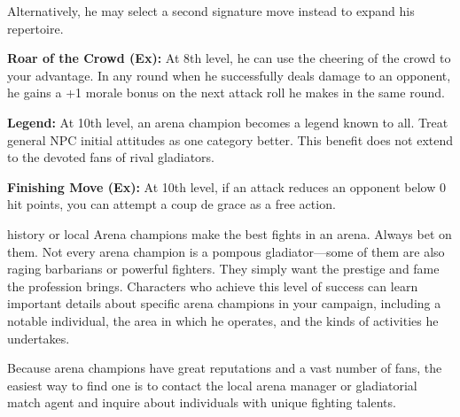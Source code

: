 {Alternatively, he may select a second signature move instead to expand his repertoire.

\textbf{Roar of the Crowd (Ex):} At 8th level, he can use the cheering of the crowd to your advantage. In any round when he successfully deals damage to an opponent, he gains a +1 morale bonus on the next attack roll he makes in the same round.

\textbf{Legend:} At 10th level, an arena champion becomes a legend known to all. Treat general NPC initial attitudes as one category better. This benefit does not extend to the devoted fans of rival gladiators.

\textbf{Finishing Move (Ex):} At 10th level, if an attack reduces an opponent below 0 hit points, you can attempt a coup de grace as a free action.
}
{}
{history or local}
{Arena champions make the best fights in an arena. Always bet on them.}
{Not every arena champion is a pompous gladiator---some of them are also raging barbarians or powerful fighters. They simply want the prestige and fame the profession brings.}
{Characters who achieve this level of success can learn important details about specific arena champions in your campaign, including a notable individual, the area in which he operates, and the kinds of activities he undertakes.}

Because arena champions have great reputations and a vast number of fans, the easiest way to find one is to contact the local arena manager or gladiatorial match agent and inquire about individuals with unique fighting talents.